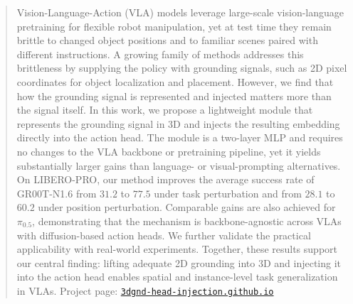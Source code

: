 \begin{abstract}
Vision-Language-Action (VLA) models leverage large-scale vision-language pretraining for flexible robot manipulation, yet at test time they remain brittle to changed object positions and to familiar scenes paired with different instructions. 
A growing family of methods addresses this brittleness by supplying the policy with grounding signals, such as 2D pixel coordinates for object localization and placement. 
However, we find that how the grounding signal is represented and injected matters more than the signal itself. In this work, we propose a lightweight module that represents the grounding signal in 3D and injects the resulting embedding directly into the action head. The module is a two-layer MLP and requires no changes to the VLA backbone or pretraining pipeline, yet it yields substantially larger gains than language- or visual-prompting alternatives. 
On LIBERO-PRO, our method improves the average success rate of GR00T-N1.6 from $31.2$ to $77.5$ under task perturbation and from $28.1$ to $60.2$ under position perturbation. Comparable gains are also achieved for $\pi_{0.5}$, demonstrating that the mechanism is backbone-agnostic across VLAs with diffusion-based action heads. 
We further validate the practical applicability with real-world experiments. 
Together, these results support our central finding: lifting adequate 2D grounding into 3D and injecting it into the action head enables spatial and instance-level task generalization in VLAs. 
Project page: \href{https://3dgnd-head-injection.github.io/}{\texttt{3dgnd-head-injection.github.io}}


\end{abstract}
